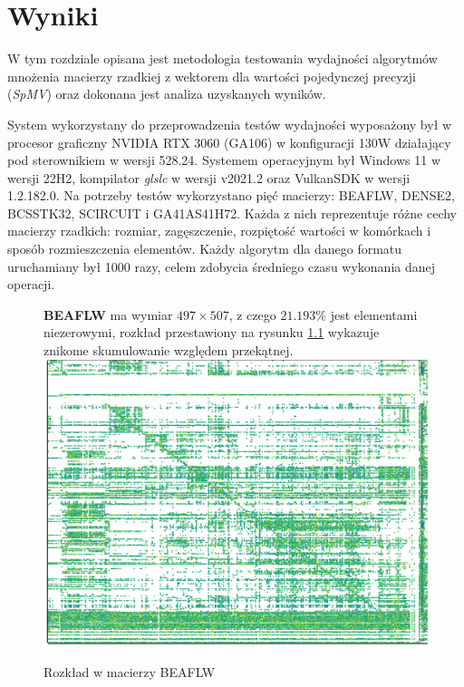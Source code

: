 \chapter{Wyniki}
\label{cha:wyniki}

W tym rozdziale opisana jest metodologia testowania wydajności algorytmów mnożenia macierzy rzadkiej z wektorem dla wartości pojedynczej precyzji (\textit{SpMV}) oraz dokonana jest analiza uzyskanych wyników.

System wykorzystany do przeprowadzenia testów wydajności wyposażony był w procesor graficzny NVIDIA RTX 3060 (GA106) w konfiguracji 130W działający pod sterownikiem w wersji 528.24.
Systemem operacyjnym był Windows 11 w wersji 22H2, kompilator \textit{glslc} \cite{glslcgithub} w wersji v2021.2 oraz VulkanSDK \cite{vulkansdk} w wersji 1.2.182.0.
Na potrzeby testów wykorzystano pięć macierzy: BEAFLW, DENSE2, BCSSTK32, SCIRCUIT i GA41AS41H72.
Każda z nich reprezentuje różne cechy macierzy rzadkich: rozmiar, zagęszczenie, rozpiętość wartości w komórkach i sposób rozmieszczenia elementów.
Każdy algorytm dla danego formatu uruchamiany był 1000 razy, celem zdobycia średniego czasu wykonania danej operacji.

\begin{figure}[!htb]
    \textbf{BEAFLW} ma wymiar $497 \times 507$, z czego $21.193\%$ jest elementami niezerowymi, rozkład przestawiony na rysunku \ref{beaflw_matrix_plot} wykazuje znikome skumulowanie względem przekątnej.
\endminipage\hfill
{}
  \includegraphics[width=\linewidth]{matrix_plots/beaflw.png}
  \caption{Rozkład w macierzy BEAFLW}\label{beaflw_matrix_plot}
\endminipage\hfill
\end{figure}

